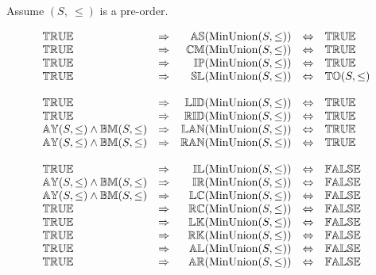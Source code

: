 Assume $(S,\ \leq)$ is a pre-order.

\[
\begin{array}{lcrcl} 
{\mathbb{TRUE}}
	& \Rightarrow
	& {\mathbb{AS}}(\mathrm{MinUnion}(S, \leq)) 
	& \Leftrightarrow 
	& {\mathbb{TRUE}} 
	\\ 
{\mathbb{TRUE}}
	& \Rightarrow
	& {\mathbb{CM}}(\mathrm{MinUnion}(S, \leq)) 
	& \Leftrightarrow 
  	& {\mathbb{TRUE}}
	\\ 
{\mathbb{TRUE}}
	& \Rightarrow
	& {\mathbb{IP}}(\mathrm{MinUnion}(S, \leq)) 
	& \Leftrightarrow 
	& {\mathbb{TRUE}}
	\\
{\mathbb{TRUE}}
	& \Rightarrow
	& {\mathbb{SL}}(\mathrm{MinUnion}(S, \leq)) 
	& \Leftrightarrow 
	& {\mathbb{TO}}(S, \leq)  
	\\\\
	
{\mathbb{TRUE}}
	& \Rightarrow
	& {\mathbb{LID}}(\mathrm{MinUnion}(S, \leq)) 
	& \Leftrightarrow 
	& {\mathbb{TRUE}}
	\\
{\mathbb{TRUE}}
	& \Rightarrow
	& {\mathbb{RID}}(\mathrm{MinUnion}(S, \leq)) 
	& \Leftrightarrow 
	& {\mathbb{TRUE}}
	\\
{\mathbb{AY}}(S, \leq) \wedge {\mathbb{BM}}(S, \leq)
	& \Rightarrow
	& {\mathbb{LAN}}(\mathrm{MinUnion}(S, \leq)) 
	& \Leftrightarrow 
	& {\mathbb{TRUE}}
	\\
{\mathbb{AY}}(S, \leq) \wedge {\mathbb{BM}}(S, \leq)
	& \Rightarrow
	& {\mathbb{RAN}}(\mathrm{MinUnion}(S, \leq)) 
	& \Leftrightarrow 
	& {\mathbb{TRUE}}
	\\\\
	
{\mathbb{TRUE}}
	& \Rightarrow
	& {\mathbb{IL}}(\mathrm{MinUnion}(S, \leq)) 
	& \Leftrightarrow
	& {\mathbb{FALSE}} 
	\\
{\mathbb{AY}}(S, \leq) \wedge {\mathbb{BM}}(S, \leq)
	& \Rightarrow
	& {\mathbb{IR}}(\mathrm{MinUnion}(S, \leq)) 
	& \Leftrightarrow
	& {\mathbb{FALSE}} 
	\\
{\mathbb{AY}}(S, \leq) \wedge {\mathbb{BM}}(S, \leq)
	& \Rightarrow
	& {\mathbb{LC}}(\mathrm{MinUnion}(S, \leq)) 
	& \Leftrightarrow
	& {\mathbb{FALSE}} 
	\\
{\mathbb{TRUE}}
	& \Rightarrow
	& {\mathbb{RC}}(\mathrm{MinUnion}(S, \leq)) 
	& \Leftrightarrow
	& {\mathbb{FALSE}} 
	\\
{\mathbb{TRUE}}
	& \Rightarrow
	& {\mathbb{LK}}(\mathrm{MinUnion}(S, \leq)) 
	& \Leftrightarrow
	& {\mathbb{FALSE}} 
	\\
{\mathbb{TRUE}}
	& \Rightarrow
	& {\mathbb{RK}}(\mathrm{MinUnion}(S, \leq)) 
	& \Leftrightarrow
	& {\mathbb{FALSE}} 
	\\
{\mathbb{TRUE}}
	& \Rightarrow
	& {\mathbb{AL}}(\mathrm{MinUnion}(S, \leq))  
	& \Leftrightarrow
	& {\mathbb{FALSE}} 
	\\
{\mathbb{TRUE}}
	& \Rightarrow
	& {\mathbb{AR}}(\mathrm{MinUnion}(S, \leq))  
	& \Leftrightarrow
	& {\mathbb{FALSE}} 
	\\
\end{array} 
\] 
